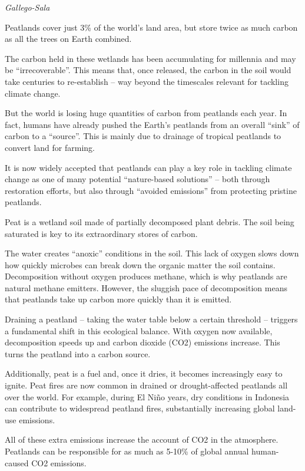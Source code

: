 \documentclass[
]{book}
\begin{document}
\emph{Gallego-Sala}

Peatlands cover just 3\% of the world's land area, but store twice as much carbon as all the trees on Earth combined.

The carbon held in these wetlands has been accumulating for millennia and may be ``irrecoverable''. This means that, once released, the carbon in the soil would take centuries to re-establish -- way beyond the timescales relevant for tackling climate change.

But the world is losing huge quantities of carbon from peatlands each year. In fact, humans have already pushed the Earth's peatlands from an overall ``sink'' of carbon to a ``source''. This is mainly due to drainage of tropical peatlands to convert land for farming.

It is now widely accepted that peatlands can play a key role in tackling climate change as one of many potential ``nature-based solutions'' -- both through restoration efforts, but also through ``avoided emissions'' from protecting pristine peatlands.

Peat is a wetland soil made of partially decomposed plant debris. The soil being saturated is key to its extraordinary stores of carbon.

The water creates ``anoxic'' conditions in the soil. This lack of oxygen slows down how quickly microbes can break down the organic matter the soil contains. Decomposition without oxygen produces methane, which is why peatlands are natural methane emitters. However, the sluggish pace of decomposition means that peatlands take up carbon more quickly than it is emitted.

Draining a peatland -- taking the water table below a certain threshold -- triggers a fundamental shift in this ecological balance. With oxygen now available, decomposition speeds up and carbon dioxide (CO2) emissions increase. This turns the peatland into a carbon source.

Additionally, peat is a fuel and, once it dries, it becomes increasingly easy to ignite. Peat fires are now common in drained or drought-affected peatlands all over the world. For example, during El Niño years, dry conditions in Indonesia can contribute to widespread peatland fires, substantially increasing global land-use emissions.

All of these extra emissions increase the account of CO2 in the atmosphere. Peatlands can be responsible for as much as 5-10\% of global annual human-caused CO2 emissions.
\end{document}
